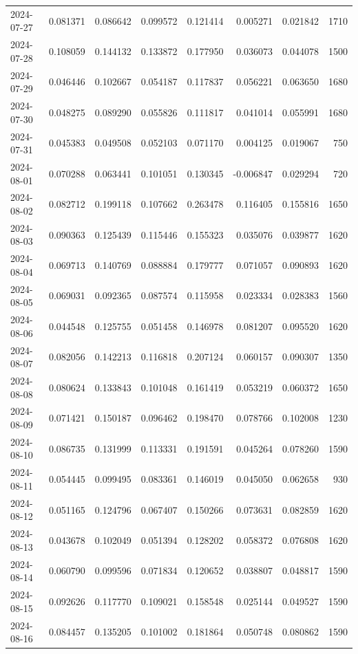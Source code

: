 \begin{tabular}{lrrrrrrr}
2024-07-27 & 0.081371 & 0.086642 & 0.099572 & 0.121414 & 0.005271 & 0.021842 & 1710 \\
2024-07-28 & 0.108059 & 0.144132 & 0.133872 & 0.177950 & 0.036073 & 0.044078 & 1500 \\
2024-07-29 & 0.046446 & 0.102667 & 0.054187 & 0.117837 & 0.056221 & 0.063650 & 1680 \\
2024-07-30 & 0.048275 & 0.089290 & 0.055826 & 0.111817 & 0.041014 & 0.055991 & 1680 \\
2024-07-31 & 0.045383 & 0.049508 & 0.052103 & 0.071170 & 0.004125 & 0.019067 & 750 \\
2024-08-01 & 0.070288 & 0.063441 & 0.101051 & 0.130345 & -0.006847 & 0.029294 & 720 \\
2024-08-02 & 0.082712 & 0.199118 & 0.107662 & 0.263478 & 0.116405 & 0.155816 & 1650 \\
2024-08-03 & 0.090363 & 0.125439 & 0.115446 & 0.155323 & 0.035076 & 0.039877 & 1620 \\
2024-08-04 & 0.069713 & 0.140769 & 0.088884 & 0.179777 & 0.071057 & 0.090893 & 1620 \\
2024-08-05 & 0.069031 & 0.092365 & 0.087574 & 0.115958 & 0.023334 & 0.028383 & 1560 \\
2024-08-06 & 0.044548 & 0.125755 & 0.051458 & 0.146978 & 0.081207 & 0.095520 & 1620 \\
2024-08-07 & 0.082056 & 0.142213 & 0.116818 & 0.207124 & 0.060157 & 0.090307 & 1350 \\
2024-08-08 & 0.080624 & 0.133843 & 0.101048 & 0.161419 & 0.053219 & 0.060372 & 1650 \\
2024-08-09 & 0.071421 & 0.150187 & 0.096462 & 0.198470 & 0.078766 & 0.102008 & 1230 \\
2024-08-10 & 0.086735 & 0.131999 & 0.113331 & 0.191591 & 0.045264 & 0.078260 & 1590 \\
2024-08-11 & 0.054445 & 0.099495 & 0.083361 & 0.146019 & 0.045050 & 0.062658 & 930 \\
2024-08-12 & 0.051165 & 0.124796 & 0.067407 & 0.150266 & 0.073631 & 0.082859 & 1620 \\
2024-08-13 & 0.043678 & 0.102049 & 0.051394 & 0.128202 & 0.058372 & 0.076808 & 1620 \\
2024-08-14 & 0.060790 & 0.099596 & 0.071834 & 0.120652 & 0.038807 & 0.048817 & 1590 \\
2024-08-15 & 0.092626 & 0.117770 & 0.109021 & 0.158548 & 0.025144 & 0.049527 & 1590 \\
2024-08-16 & 0.084457 & 0.135205 & 0.101002 & 0.181864 & 0.050748 & 0.080862 & 1590 \\

\end{tabular}
